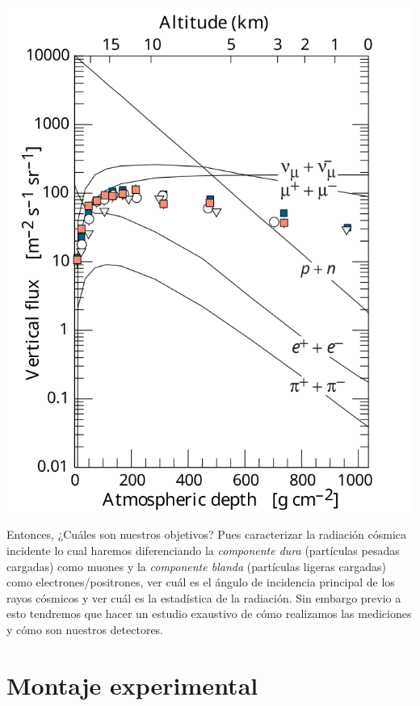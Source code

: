\documentclass[11pt]{article}
\begin{document}
\begin{minipage}{0.39\linewidth}
	\begin{center}
		\includegraphics[width=0.95\linewidth]{../Imagenes/Cinderella.png}
		\label{Fig:01}
	\end{center}
\end{minipage}

Entonces, ¿Cuáles son nuestros objetivos? Pues caracterizar la radiación cósmica incidente lo cual haremos diferenciando la \textit{componente dura} (partículas pesadas cargadas) como muones y la \textit{componente blanda} (partículas ligeras cargadas) como electrones/positrones, ver cuál es el ángulo de incidencia principal de los rayos cósmicos y ver cuál es la estadística de la radiación. Sin embargo previo a esto tendremos que hacer un estudio exaustivo de cómo realizamos las mediciones y cómo son nuestros detectores.

\section{Montaje experimental}
\end{document}
